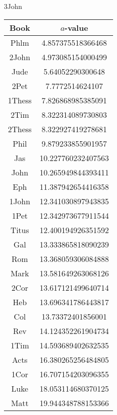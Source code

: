 \documentclass[12pt,letterpaper]{article}
\begin{document}
3John
\begin{longtable}{|c|c|}
\hline
 Book & $a$-value \\ \hline
Phlm & 4.857375518366468 \\ \hline
 2John & 4.973085154000499 \\ \hline
 Jude & 5.64052290300648 \\ \hline
 2Pet & 7.7772514624107 \\ \hline
 1Thess & 7.826868985385091 \\ \hline
 2Tim & 8.322314089730803 \\ \hline
 2Thess & 8.322927419278681 \\ \hline
 Phil & 9.879233855901957 \\ \hline
 Jas & 10.227760232407563 \\ \hline
 John & 10.265949844393411 \\ \hline
 Eph & 11.387942654416358 \\ \hline
 1John & 12.341030897943835 \\ \hline
 1Pet & 12.342973677911544 \\ \hline
 Titus & 12.400194926351592 \\ \hline
 Gal & 13.333865818090239 \\ \hline
 Rom & 13.368059306084888 \\ \hline
 Mark & 13.581649263068126 \\ \hline
 2Cor & 13.617121499640714 \\ \hline
 Heb & 13.696341786443817 \\ \hline
 Col & 13.73372401856001 \\ \hline
 Rev & 14.124352261904734 \\ \hline
 1Tim & 14.593689402632535 \\ \hline
 Acts & 16.380265256484805 \\ \hline
 1Cor & 16.707154203096355 \\ \hline
 Luke & 18.053114680370125 \\ \hline
 Matt & 19.944348788153366 \\ \hline 
\end{longtable}
\end{document}
